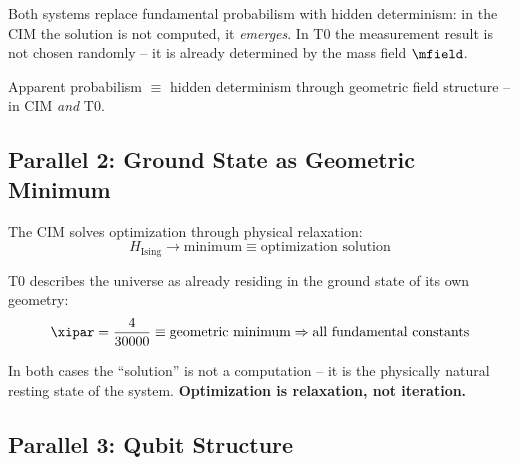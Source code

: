 Both systems replace fundamental probabilism with hidden determinism:
in the CIM the solution is not computed, it \emph{emerges}.
In T0 the measurement result is not chosen randomly -- it is already determined
by the mass field $\mfield$.

\begin{keyresult}[Parallel 1]
    Apparent probabilism $\equiv$ hidden determinism through geometric field structure --
    in CIM \emph{and} T0.
\end{keyresult}

\subsection{Parallel 2: Ground State as Geometric Minimum}

The CIM solves optimization through physical relaxation:
\begin{equation}
    H_{\text{Ising}} \rightarrow \text{minimum} \equiv \text{optimization solution}
    \label{eq:cim_groundstate}
\end{equation}

T0 describes the universe as already residing in the ground state of its own geometry:
\begin{equation}
    \xipar = \frac{4}{30000} \equiv \text{geometric minimum} \Rightarrow
    \text{all fundamental constants}
    \label{eq:t0_groundstate}
\end{equation}

In both cases the ``solution'' is not a computation -- it is the physically natural
resting state of the system. \textbf{Optimization is relaxation, not iteration.}

\subsection{Parallel 3: Qubit Structure}

\begin{table}[h]
    \centering
    \caption{Parallel 3: Comparison of qubit structures}
    \label{tab:parallel3}
\end{table}

